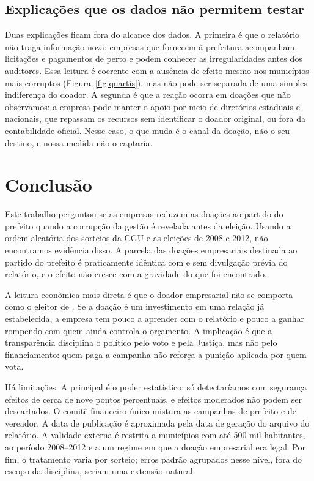 \subsection{Explicações que os dados não permitem testar}

Duas explicações ficam fora do alcance dos dados. A primeira é que o relatório não traga informação nova:
empresas que fornecem à prefeitura acompanham licitações e pagamentos de perto e podem conhecer as
irregularidades antes dos auditores. Essa leitura é coerente com a ausência de efeito mesmo nos municípios
mais corruptos (Figura~\ref{fig:quartis}), mas não pode ser separada de uma simples indiferença do doador.
A segunda é que a reação ocorra em doações que não observamos: a empresa pode manter o apoio por meio de
diretórios estaduais e nacionais, que repassam os recursos sem identificar o doador original, ou fora da
contabilidade oficial. Nesse caso, o que muda é o canal da doação, não o seu destino, e nossa medida não o
captaria.

\FloatBarrier
\section{Conclusão}\label{sec:concl}

Este trabalho perguntou se as empresas reduzem as doações ao partido do prefeito quando a corrupção da
gestão é revelada antes da eleição. Usando a ordem aleatória dos sorteios da CGU e as eleições de 2008 e
2012, não encontramos evidência disso. A parcela das doações empresariais destinada ao partido do
prefeito é praticamente idêntica com e sem divulgação prévia do relatório, e o efeito não cresce com a
gravidade do que foi encontrado.

A leitura econômica mais direta é que o doador empresarial não se comporta como o eleitor de
. Se a doação é um investimento em uma relação já estabelecida, a empresa tem
pouco a aprender com o relatório e pouco a ganhar rompendo com quem ainda controla o orçamento. A
implicação é que a transparência disciplina o político pelo voto e pela Justiça, mas não pelo
financiamento: quem paga a campanha não reforça a punição aplicada por quem vota.

Há limitações. A principal é o poder estatístico: só detectaríamos com segurança efeitos de cerca de nove
pontos percentuais, e efeitos moderados não podem ser descartados. O comitê financeiro único mistura as
campanhas de prefeito e de vereador. A data de publicação é aproximada pela data de geração do arquivo do relatório. A validade
externa é restrita a municípios com até 500 mil habitantes, ao período 2008--2012 e a um regime em que a
doação empresarial era legal. Por fim, o tratamento varia por sorteio; erros
padrão agrupados nesse nível, fora do escopo da disciplina, seriam uma extensão natural.

